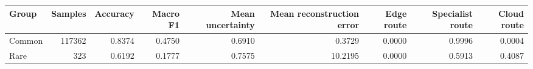 \begin{tabular}{lrrrrrrrr}
\toprule
Group & Samples & Accuracy & Macro F1 & Mean uncertainty & Mean reconstruction error & Edge route & Specialist route & Cloud route \\
\midrule
Common & 117362 & 0.8374 & 0.4750 & 0.6910 & 0.3729 & 0.0000 & 0.9996 & 0.0004 \\
Rare & 323 & 0.6192 & 0.1777 & 0.7575 & 10.2195 & 0.0000 & 0.5913 & 0.4087 \\
\bottomrule
\end{tabular}
